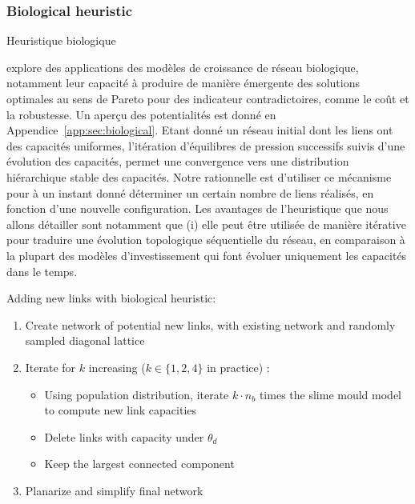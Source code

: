 \subsubsection{Biological heuristic}{Heuristique biologique}

\cite{raimbault2015labex} explore des applications des modèles de croissance de réseau biologique, notamment leur capacité à produire de manière émergente des solutions optimales au sens de Pareto pour des indicateur contradictoires, comme le coût et la robustesse. Un aperçu des potentialités est donné en Appendice~\ref{app:sec:biological}. Etant donné un réseau initial dont les liens ont des capacités uniformes, l'itération d'équilibres de pression successifs suivis d'une évolution des capacités, permet une convergence vers une distribution hiérarchique stable des capacités. Notre rationnelle est d'utiliser ce mécanisme pour à un instant donné déterminer un certain nombre de liens réalisés, en fonction d'une nouvelle configuration. Les avantages de l'heuristique que nous allons détailler sont notamment que (i) elle peut être utilisée de manière itérative pour traduire une évolution topologique séquentielle du réseau, en comparaison à la plupart des modèles d'investissement qui font évoluer uniquement les capacités dans le temps.


Adding new links with biological heuristic:

\begin{enumerate}
	\item Create network of potential new links, with existing network and randomly sampled diagonal lattice
	\item Iterate for $k$ increasing ($k\in \{ 1,2,4 \}$ in practice) :
	\begin{itemize}
		\item Using population distribution, iterate $k\cdot n_b$ times the slime mould model to compute new link capacities
		\item Delete links with capacity under $\theta_d$
		\item Keep the largest connected component
	\end{itemize}
	\item Planarize and simplify final network
\end{enumerate}


